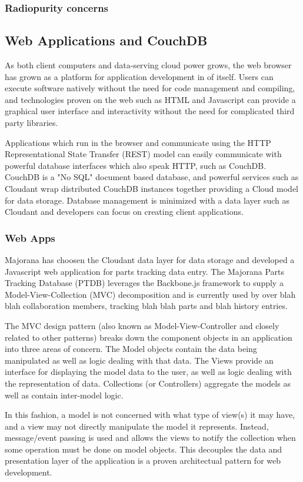 \documentclass[journal]{IEEEtran}
\begin{document}
\subsubsection{Radiopurity concerns}

\subsection{Web Applications and CouchDB}
As both client computers and data-serving cloud power grows, the web browser has grown as a
platform for application development in of itself. Users can execute software natively without
the need for code management and compiling, and technologies proven on the web such as HTML
and Javascript can provide a graphical user interface and interactivity without the need
for complicated third party libraries. 

Applications which run in the browser and communicate using the HTTP Representational State Transfer
(REST) model can easily communicate with powerful database interfaces which also speak HTTP, such as
CouchDB. CouchDB is a "No SQL" document based database, and powerful services such as Cloudant wrap
distributed CouchDB instances together providing a Cloud model for data storage. Database management
is minimized with a data layer such as Cloudant and developers can focus on creating client applications.

\subsubsection{Web Apps}
Majorana has choosen the Cloudant data layer for data storage and developed a Javascript web application
for parts tracking data entry. The Majorana Parts Tracking Database (PTDB) leverages the Backbone.js
framework to supply a Model-View-Collection (MVC) decomposition and is currently used by over blah blah
collaboration members, tracking blah blah parts and blah history entries.

The MVC design pattern (also known as Model-View-Controller and closely related to other patterns) breaks
down the component objects in an application into three areas of concern. The Model objects contain 
the data being manipulated as well as logic dealing with that data. The Views provide an interface for
displaying the model data to the user, as well as logic dealing with the representation of data. 
Collections (or Controllers) aggregate the models as well as contain inter-model logic.

In this fashion, a model is not concerned with what type of view(s) it may have, and a view may 
not directly manipulate the model it represents. Instead, message/event passing is used and allows
the views to notify the collection when some operation must be done on model objects. This decouples
the data and presentation layer of the application is a proven architectual pattern for web development.
\end{document}

